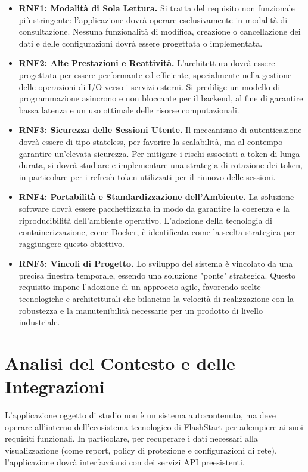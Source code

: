 \documentclass[12pt,a4paper,openright,twoside]{book}
\begin{document}
\begin{itemize}
    \item \textbf{RNF1: Modalità di Sola Lettura.} Si tratta del requisito non funzionale più stringente: l'applicazione dovrà operare esclusivamente in modalità di consultazione. Nessuna funzionalità di modifica, creazione o cancellazione dei dati e delle configurazioni dovrà essere progettata o implementata.

    \item \textbf{RNF2: Alte Prestazioni e Reattività.} L'architettura dovrà essere progettata per essere performante ed efficiente, specialmente nella gestione delle operazioni di I/O verso i servizi esterni. Si predilige un modello di programmazione asincrono e non bloccante per il backend, al fine di garantire bassa latenza e un uso ottimale delle risorse computazionali.

    \item \textbf{RNF3: Sicurezza delle Sessioni Utente.} Il meccanismo di autenticazione dovrà essere di tipo stateless, per favorire la scalabilità, ma al contempo garantire un'elevata sicurezza. Per mitigare i rischi associati a token di lunga durata, si dovrà studiare e implementare una strategia di rotazione dei token, in particolare per i refresh token utilizzati per il rinnovo delle sessioni.

    \item \textbf{RNF4: Portabilità e Standardizzazione dell'Ambiente.} La soluzione software dovrà essere pacchettizzata in modo da garantire la coerenza e la riproducibilità dell'ambiente operativo. L'adozione della tecnologia di containerizzazione, come Docker, è identificata come la scelta strategica per raggiungere questo obiettivo.

    \item \textbf{RNF5: Vincoli di Progetto.} Lo sviluppo del sistema è vincolato da una precisa finestra temporale, essendo una soluzione "ponte" strategica. Questo requisito impone l'adozione di un approccio agile, favorendo scelte tecnologiche e architetturali che bilancino la velocità di realizzazione con la robustezza e la manutenibilità necessarie per un prodotto di livello industriale.
\end{itemize}

\section{Analisi del Contesto e delle Integrazioni}
\label{sec:analisi_contesto}
L'applicazione oggetto di studio non è un sistema autocontenuto, ma deve operare all'interno dell'ecosistema tecnologico di FlashStart per adempiere ai suoi requisiti funzionali. In particolare, per recuperare i dati necessari alla visualizzazione (come report, policy di protezione e configurazioni di rete), l'applicazione dovrà interfacciarsi con dei servizi API preesistenti.
\end{document}
